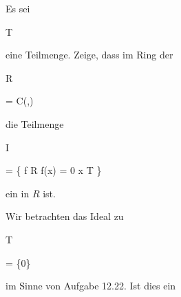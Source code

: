 {


Es sei


\mavergleichskette

{\vergleichskette

{T
}

{ \subseteq }{ \R
}

{  }{
}

{    }{
}

{   }{
}

}
{}{}{}
eine Teilmenge. Zeige, dass im Ring der


\mavergleichskettedisp

{\vergleichskette

{R
}

{ =} { C(\R,\R)
}

{ } {
}

{ } {
}

{ } {
}

}
{}{}{}
die Teilmenge


\mavergleichskettedisp

{\vergleichskette

{I
}

{ =} { \left\{ f \in R  \mid   f(x) = 0  x \in T         \right\}
}

{ } {
}

{ } {
}

{ } {
}

}
{}{}{}
ein
in $R$ ist.


}

{} {}



{}

{


Wir betrachten das Ideal zu


\mavergleichskette

{\vergleichskette

{T
}

{ = }{ \{0\}
}

{ \subseteq }{\R
}

{    }{
}

{   }{
}

}
{}{}{}
im Sinne von
Aufgabe 12.22.
Ist dies ein


}

{} {}



{}

